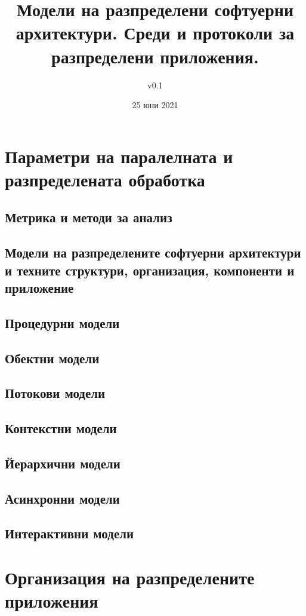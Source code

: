 \documentclass[fleqn,12pt]{article}
\title{Модели на разпределени софтуерни архитектури. Среди и протоколи за разпределени приложения.}
\author{v0.1}
\date{25 юни 2021}
\begin{document}
\maketitle
\tableofcontents
\pagebreak

\section{Параметри на паралелната и разпределената обработка}

\subsection{Метрика и методи за анализ}

\subsection{Модели на разпределените софтуерни архитектури и техните структури, организация, компоненти и приложение}

\subsection{Процедурни модели}
\subsection{Обектни модели}
\subsection{Потокови модели}
\subsection{Контекстни модели}
\subsection{Йерархични модели}
\subsection{Асинхронни модели}
\subsection{Интерактивни модели}

\section{Организация на разпределените приложения}
\end{document}
